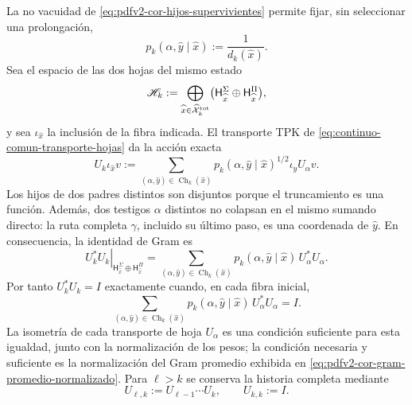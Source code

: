 La no vacuidad de \eqref{eq:pdfv2-cor-hijos-supervivientes} permite fijar,
sin seleccionar una prolongación,
\begin{equation}
\label{eq:pdfv2-cor-peso-conteo}
 p_k(\alpha,\widehat y\mid\widehat x)
 :=\frac1{d_k(\widehat x)}.
\end{equation}
Sea el espacio de las dos hojas del mismo estado
\begin{equation}
\label{eq:pdfv2-cor-hilbert-hojas}
 \mathscr H_k:=
 \bigoplus_{\widehat x\in\widehat{\mathcal X}^{\rm tot}_k}
 \bigl(\mathsf H_{\widehat x}^{\Sigma}
       \oplus\mathsf H_{\widehat x}^{\Pi}\bigr),
\end{equation}
y sea \(\iota_{\widehat x}\) la inclusión de la fibra indicada. El transporte
TPK de \eqref{eq:continuo-comun-transporte-hojas} da la acción exacta
\begin{equation}
\label{eq:pdfv2-cor-u-comun}
 U_k\iota_{\widehat x}v:=
 \sum_{(\alpha,\widehat y)\in\operatorname{Ch}_k(\widehat x)}
 p_k(\alpha,\widehat y\mid\widehat x)^{1/2}
 \iota_{\widehat y}U_\alpha v.
\end{equation}
Los hijos de dos padres distintos son disjuntos porque el truncamiento es una
función. Además, dos testigos \(\alpha\) distintos no colapsan en el mismo
sumando directo: la ruta completa \(\gamma\), incluido su último paso, es una
coordenada de \(\widehat y\). En consecuencia, la identidad de Gram es
\begin{equation}
\label{eq:pdfv2-cor-u-gram}
 \left.U_k^*U_k\right|_{\mathsf H_{\widehat x}^{\Sigma}
       \oplus\mathsf H_{\widehat x}^{\Pi}}
 =
 \sum_{(\alpha,\widehat y)\in\operatorname{Ch}_k(\widehat x)}
 p_k(\alpha,\widehat y\mid\widehat x)\,U_\alpha^*U_\alpha.
\end{equation}
Por tanto \(U_k^*U_k=I\) exactamente cuando, en cada fibra inicial,
\begin{equation}
\label{eq:pdfv2-cor-gram-promedio-normalizado}
 \sum_{(\alpha,\widehat y)\in\operatorname{Ch}_k(\widehat x)}
 p_k(\alpha,\widehat y\mid\widehat x)\,U_\alpha^*U_\alpha=I.
\end{equation}
La isometría de cada transporte de hoja \(U_\alpha\) es una condición
suficiente para esta igualdad, junto con la normalización de los pesos;
la condición necesaria y suficiente es la normalización del Gram promedio
exhibida en \eqref{eq:pdfv2-cor-gram-promedio-normalizado}.
Para \(\ell>k\) se conserva la historia completa mediante
\begin{equation}
\label{eq:pdfv2-cor-u-iterado}
 U_{\ell,k}:=U_{\ell-1}\cdots U_k,
 \qquad U_{k,k}:=I.
\end{equation}

